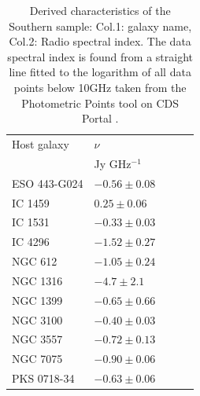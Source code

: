 	\begin{table}
		\centering
		\caption{Derived characteristics of the Southern sample: Col.1: galaxy name, Col.2: Radio spectral index. The data spectral index is found from a straight line fitted to the logarithm of all data points below 10GHz taken from the Photometric Points tool on CDS Portal \citep{Wenger2000}.}
		\label{tab:sampleDerived}
		\begin{tabular}{l l l l l}
			\hline
			\hline
			Host galaxy	& $\nu $ 			\\
						& Jy GHz$^{-1}$		\\
			\hline 
			ESO 443-G024 & $-0.56 \pm 0.08$	\\
			IC 1459 	& $0.25 \pm 0.06$ 	\\
			IC 1531 	& $-0.33 \pm 0.03$ 	\\
			IC 4296		& $-1.52 \pm 0.27$ 	\\
			NGC 612 	& $-1.05 \pm 0.24$ 	\\
			NGC 1316 	& $-4.7 \pm 2.1$ 	\\
			NGC 1399 	& $-0.65 \pm 0.66$ 	\\
			NGC 3100 	& $-0.40 \pm 0.03$ 	\\
			NGC 3557 	& $-0.72 \pm 0.13$ 	\\
			NGC 7075 	& $-0.90 \pm 0.06$ 	\\
			PKS 0718-34 & $-0.63 \pm 0.06$ 	\\
			\hline
			\hline
		\end{tabular}
	\end{table}
	














